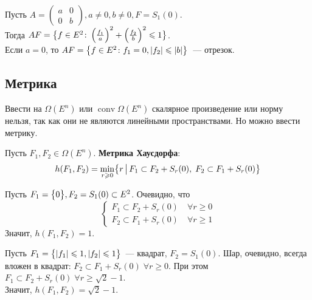 \begin{exmp}
    Пусть $A = \left( \begin{matrix}
        a & 0 \\
        0 & b
    \end{matrix} \right), a \neq 0, b \neq 0, F = S_1(0)$. \\
    Тогда $AF = \bigl\{ f \in E^2 \colon \left( \frac{f_1}{a} \right)^{2} + \left( \frac{f_2}{b} \right)^{2} \leqslant 1 \bigr\}$.\\
    Если $a = 0$, то $AF = \bigl\{ f \in E^2\colon f_1 = 0, |f_2| \leqslant |b| \bigr\}$~--- отрезок.
\end{exmp}

\subsection{Метрика}
Ввести на $\Omega(E^n)$ или $\operatorname{conv} \Omega(E^n)$ скалярное произведение или норму нельзя, так как они не являются линейными пространствами.
Но можно ввести метрику.

\begin{defn}
    Пусть $F_1, F_2 \in \Omega(E^n)$.
    \textbf{Метрика Хаусдорфа}:
    \begin{equation}
        h(F_1, F_2) = \min\limits_{r \geqslant 0} \bigl\{ r \, \bigl| \, F_1 \subset F_2 + S_r(0), \; F_2 \subset F_1 + S_r(0) \bigr\}
    \end{equation}
\end{defn}

\begin{exmp}
    Пусть $F_1 = \bigl\{ 0 \bigr\}, F_2 = S_1(0) \subset E^2$.
    Очевидно, что
    \begin{equation*}
        \begin{cases}
            F_1 \subset F_2 + S_r(0) \quad \forall r \geqslant 0 \\
            F_2 \subset F_1 + S_r(0) \quad \forall r \geqslant 1
        \end{cases}
    \end{equation*}
    Значит, $h(F_1, F_2) = 1$.
\end{exmp}

\begin{exmp}
    Пусть $F_1 = \bigl\{ |f_1| \leqslant 1, |f_2| \leqslant 1 \bigr\}$~--- квадрат, $F_2 = S_1(0)$.
    Шар, очевидно, всегда вложен в квадрат: $F_2 \subset F_1 + S_r(0) \; \forall r \geqslant 0$.
    При этом $F_1 \subset F_2 + S_r(0) \; \forall r \geqslant \sqrt{2} - 1$. \\
    Значит, $h(F_1, F_2) = \sqrt{2} - 1$.
\end{exmp}

